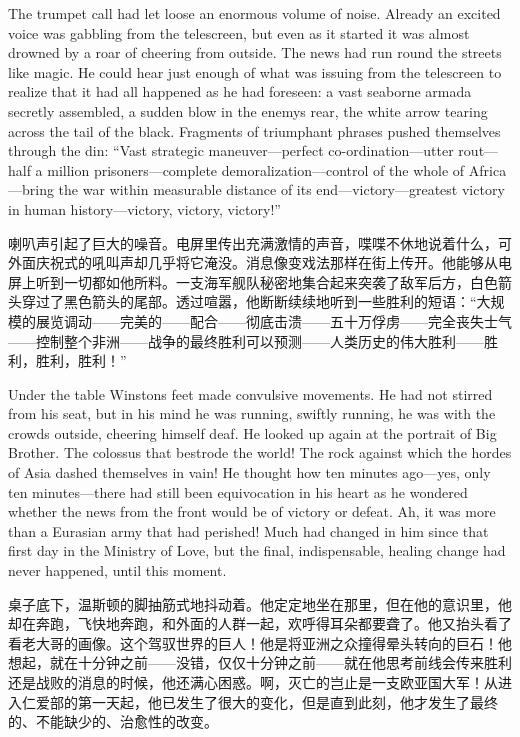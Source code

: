 \begin{paracol}{2}
The trumpet call had let loose an enormous volume of noise. Already an
excited voice was gabbling from the telescreen, but even as it started
it was almost drowned by a roar of cheering from outside. The news had
run round the streets like magic. He could hear just enough of what was
issuing from the telescreen to realize that it had all happened as he
had foreseen: a vast seaborne armada secretly assembled, a sudden blow
in the enemy\textquotesingle s rear, the white arrow tearing across the
tail of the black. Fragments of triumphant phrases pushed themselves
through the din: ``Vast strategic maneuver---perfect
co-ordination---utter rout---half a million prisoners---complete
demoralization---control of the whole of Africa---bring the war within
measurable distance of its end---victory---greatest victory in human
history---victory, victory, victory!''

\switchcolumn

喇叭声引起了巨大的噪音。电屏里传出充满激情的声音，喋喋不休地说着什么，可外面庆祝式的吼叫声却几乎将它淹没。消息像变戏法那样在街上传开。他能够从电屏上听到一切都如他所料。一支海军舰队秘密地集合起来突袭了敌军后方，白色箭头穿过了黑色箭头的尾部。透过喧嚣，他断断续续地听到一些胜利的短语：``大规模的展览调动——完美的——配合——彻底击溃——五十万俘虏——完全丧失士气——控制整个非洲——战争的最终胜利可以预测——人类历史的伟大胜利——胜利，胜利，胜利！''

\switchcolumn*

Under the table Winston\textquotesingle s feet made convulsive
movements. He had not stirred from his seat, but in his mind he was
running, swiftly running, he was with the crowds outside, cheering
himself deaf. He looked up again at the portrait of Big Brother. The
colossus that bestrode the world! The rock against which the hordes of
Asia dashed themselves in vain! He thought how ten minutes ago---yes,
only ten minutes---there had still been equivocation in his heart as he
wondered whether the news from the front would be of victory or defeat.
Ah, it was more than a Eurasian army that had perished! Much had changed
in him since that first day in the Ministry of Love, but the final,
indispensable, healing change had never happened, until this moment.

\switchcolumn

桌子底下，温斯顿的脚抽筋式地抖动着。他定定地坐在那里，但在他的意识里，他却在奔跑，飞快地奔跑，和外面的人群一起，欢呼得耳朵都要聋了。他又抬头看了看老大哥的画像。这个驾驭世界的巨人！他是将亚洲之众撞得晕头转向的巨石！他想起，就在十分钟之前——没错，仅仅十分钟之前——就在他思考前线会传来胜利还是战败的消息的时候，他还满心困惑。啊，灭亡的岂止是一支欧亚国大军！从进入仁爱部的第一天起，他已发生了很大的变化，但是直到此刻，他才发生了最终的、不能缺少的、治愈性的改变。


\end{paracol}
